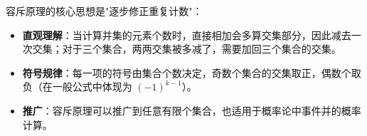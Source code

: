 \begin{explanationbox}
容斥原理的核心思想是"逐步修正重复计数"：
\begin{itemize}
    \item \textbf{直观理解}：当计算并集的元素个数时，直接相加会多算交集部分，因此减去一次交集；对于三个集合，两两交集被多减了，需要加回三个集合的交集。
    \item \textbf{符号规律}：每一项的符号由集合个数决定，奇数个集合的交集取正，偶数个取负（在一般公式中体现为 $(-1)^{k-1}$）。
    \item \textbf{推广}：容斥原理可以推广到任意有限个集合，也适用于概率论中事件并的概率计算。
\end{itemize}
\end{explanationbox}
